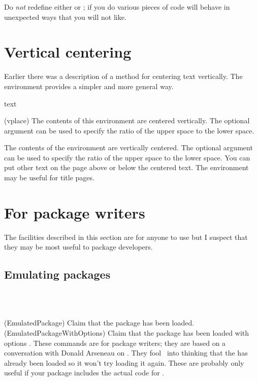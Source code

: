     Do \emph{not} redefine either \cmd{\memjustarg} or \cmd{\memgobble}; if
you do various pieces of code will behave in unexpected ways that you
will not like.

\section{Vertical centering}

    Earlier there was a description of a method for centering text vertically.
The  environment provides a simpler and more general way.
\begin{syntax}
 text  \\
\end{syntax}
\glossary(vplace)%
  {}%
  {The contents of this environment are centered vertically. The optional
   argument can be used to specify the ratio of the upper space 
   to the lower space.}%

    The contents of the  environment are vertically centered. 
The optional  argument can be used to specify the ratio of the 
upper space to the lower space. You can put other text on the page above
or below the centered text. The environment may be useful for 
title pages.

\section{For package writers}

    The facilities described in this section are for anyone to use but
I suspect that they may be most useful to package developers.

\subsection{Emulating packages}

\begin{syntax}
\cmd{\EmulatedPackage} \\
\cmd{\EmulatedPackageWithOptions} \\
\end{syntax}
\glossary(EmulatedPackage)%
  {}%
  {Claim that the  package has been loaded.}%
\glossary(EmulatedPackageWithOptions)%
  {}%
  {Claim that the  package has been loaded with options
  .}%
These commands are for package writers; they are based on a conversation with
Donald Arseneau on \ctt. They fool \ltx\ into 
thinking that the  has already been loaded so it won't
try loading it again. These are probably only useful if your
package includes the actual code for . 

